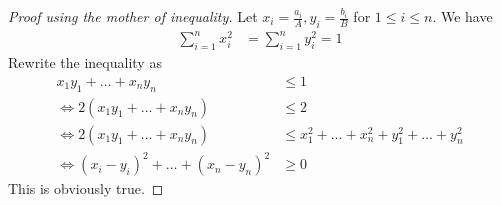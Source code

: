\documentclass{subfile}
\begin{document}
		\begin{proof}[Proof using the mother of inequality]
			Let $x_i=\frac{a_i}{A},y_i=\frac{b_i}{B}$ for $1\leq i\leq n$. We have
				\begin{align*}
					\sum_{i=1}^nx_i^2
						& = \sum_{i=1}^ny_i^2=1
				\end{align*}
			Rewrite the inequality as
				\begin{align*}
					x_1y_1+\ldots+x_ny_n
						& \leq1\\
					\iff2(x_1y_1+\ldots+x_ny_n)
						& \leq2\\
					\iff2(x_1y_1+\ldots+x_ny_n)
						& \leq x_1^2+\ldots+x_n^2+y_1^2+\ldots+y_n^2\\
					\iff(x_i-y_i)^2+\ldots+(x_n-y_n)^2
						& \geq0
				\end{align*}
			This is obviously true.
		\end{proof}
	
\end{document}
